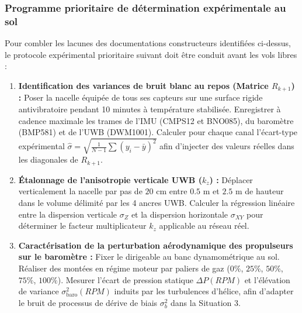 \documentclass[../Formulations_Kalman.tex]{subfiles}
\begin{document}
\subsubsection{Programme prioritaire de détermination expérimentale au sol}
Pour combler les lacunes des documentations constructeurs identifiées ci-dessus, le protocole expérimental prioritaire suivant doit être conduit avant les vols libres :
\begin{enumerate}
    \item \textbf{Identification des variances de bruit blanc au repos (Matrice $R_{k+1}$) :}
    Poser la nacelle équipée de tous ses capteurs sur une surface rigide antivibratoire pendant 10 minutes à température stabilisée. Enregistrer à cadence maximale les trames de l'IMU (CMPS12 et BNO085), du baromètre (BMP581) et de l'UWB (DWM1001). Calculer pour chaque canal l'écart-type expérimental $\hat{\sigma} = \sqrt{\frac{1}{N-1}\sum (y_i - \bar{y})^2}$ afin d'injecter des valeurs réelles dans les diagonales de $R_{k+1}$.
    \item \textbf{Étalonnage de l'anisotropie verticale UWB ($k_z$) :}
    Déplacer verticalement la nacelle par pas de $20\text{ cm}$ entre $0.5\text{ m}$ et $2.5\text{ m}$ de hauteur dans le volume délimité par les 4 ancres UWB. Calculer la régression linéaire entre la dispersion verticale $\sigma_Z$ et la dispersion horizontale $\sigma_{XY}$ pour déterminer le facteur multiplicateur $k_z$ applicable au réseau réel.
    \item \textbf{Caractérisation de la perturbation aérodynamique des propulseurs sur le baromètre :}
    Fixer le dirigeable au banc dynamométrique au sol. Réaliser des montées en régime moteur par paliers de gaz ($0\%$, $25\%$, $50\%$, $75\%$, $100\%$). Mesurer l'écart de pression statique $\Delta P(RPM)$ et l'élévation de variance $\sigma_{\text{baro}}^2(RPM)$ induits par les turbulences d'hélice, afin d'adapter le bruit de processus de dérive de biais $\sigma_b^2$ dans la Situation 3.
\end{enumerate}
\end{document}
